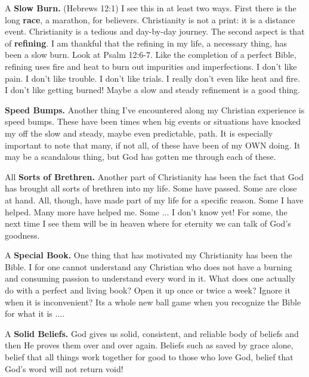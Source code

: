 \begin{compactenum}[I.][19]
    \item A \textbf{Slow Burn.} (Hebrews 12:1) I see this in at least two ways.  First there is the long \textbf{race}, a marathon, for believers. Christianity is not a print: it is a distance event. Christianity is a tedious and day-by-day journey. The second aspect is that of \textbf{refining}. I am thankful that the refining in my life, a necessary thing, has been a slow burn. Look at Psalm 12:6-7. Like the completion of a perfect Bible, refining uses fire and heat to burn out impurities and imperfections. I don't like pain. I don't like trouble. I don't like trials. I really don't even like heat and fire.  I don't like getting burned! Maybe a slow and steady refinement is a good thing. 
    \item \textbf{Speed Bumps.} Another thing I've encountered along my Christian experience is speed bumps.  These have been times when big events or situations have knocked my off the slow and steady, maybe even predictable, path. It is especially important to note that many, if not all, of these have been of my OWN doing.  It may be a scandalous thing, but God has gotten me through each of these. %
    \item All \textbf{Sorts of Brethren.} Another part of Christianity has been the fact that God has brought all sorts of brethren into my life. Some have passed.  Some are close at hand. All, though, have made part of my life for a specific reason. Some I have helped. Many more have helped me. Some ... I don't know yet! For some, the next time I see them will be in heaven where for eternity we can talk of God's goodness. %
    \item A \textbf{Special Book.} One thing that has motivated my Christianity has been the Bible.  I for one cannot understand any Christian who does not have a burning and consuming passion to understand every word in it.  What does one actually do with a perfect and living book? Open it up once or twice a week? Ignore it when it is inconvenient? Its a whole new ball game when you recognize the Bible for what it is .... %
    \item A \textbf{Solid Beliefs.} God gives us solid, consistent, and reliable body of beliefs and then He proves them over and over again.  Beliefs such as saved by grace alone, belief that all things work together for good to those who love God, belief that God's word will not return void!%

\end{compactenum}

